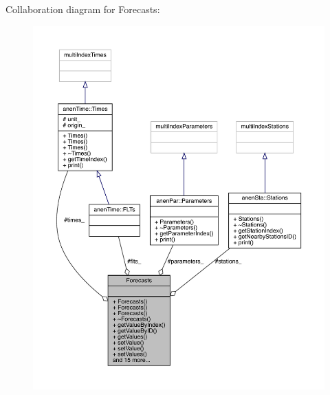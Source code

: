 Collaboration diagram for Forecasts\+:\nopagebreak
\begin{figure}[H]
\begin{center}
\leavevmode
\includegraphics[width=350pt]{class_forecasts__coll__graph}
\end{center}
\end{figure}
